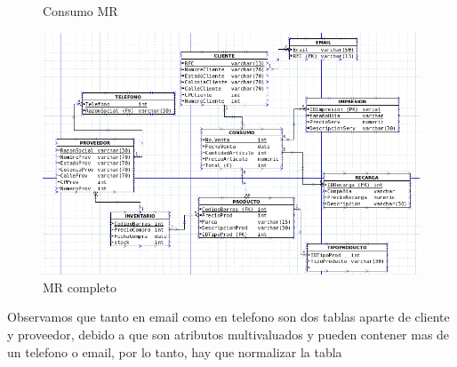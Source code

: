 \documentclass[letter,12pt]{article}
\begin{document}
\begin{center}
\begin{figure}[H]
\caption{Consumo MR}
\end{figure}
\begin{figure}[H]
\includegraphics[scale=.45]{MR.png}
\caption{MR completo}
\end{figure}
\end{center}
Observamos que tanto en email como en telefono son dos tablas aparte de cliente y proveedor, debido a que son atributos multivaluados y pueden contener mas de un telefono o email, por lo tanto, hay que normalizar la tabla
\newpage
\end{document}
